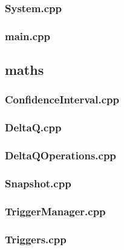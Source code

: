 \subsubsection*{System.cpp}


\subsubsection*{main.cpp}


\subsection*{maths}

\subsubsection*{ConfidenceInterval.cpp}


\subsubsection*{DeltaQ.cpp}


\subsubsection*{DeltaQOperations.cpp}


\subsubsection*{Snapshot.cpp}


\subsubsection*{TriggerManager.cpp}


\subsubsection*{Triggers.cpp}


